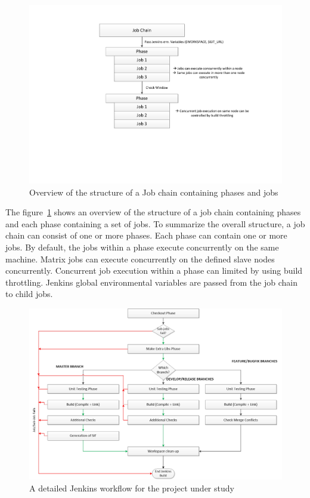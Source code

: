\documentclass[12pt, a4paper, titlepage]{scrartcl}
\begin{document}
\begin{figure}[!ht]
\centering
\hspace{-2cm}
\includegraphics[scale=0.7, trim=2cm 6cm 2cm 2cm]{ci-workflow-phase.pdf}
\caption{Overview of the structure of a Job chain containing phases and jobs}
\label{fig:ci-phase-job-structure}
\end{figure}
\par The figure~\ref{fig:ci-phase-job-structure} shows an overview of the structure of a job chain containing phases and each phase containing a set of jobs. To summarize the overall structure, a job chain can consist of one or more phases. Each phase can contain one or more jobs. By default, the jobs within a phase execute concurrently on the same machine. Matrix jobs can execute concurrently on the defined slave nodes concurrently. Concurrent job execution within a phase can limited by using build throttling. Jenkins global environmental variables are passed from the job chain to child jobs. 
\begin{figure}[!ht]
\centering
\includegraphics[width=\textwidth]{detailed-jenkins-workflow.png}
\caption{A detailed Jenkins workflow for the project under study}
\label{fig:detailed-jenkins-workflow}
\end{figure}
\end{document}
